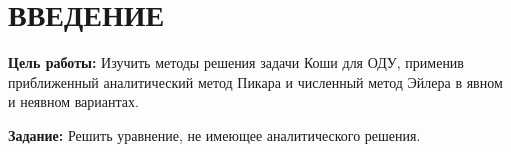 \chapter*{\hfill{}ВВЕДЕНИЕ\hfill}

\textbf{Цель работы:} Изучить методы решения задачи Коши для ОДУ, применив приближенный аналитический метод Пикара и численный метод Эйлера в явном и неявном вариантах.

\textbf{Задание:} Решить уравнение, не имеющее аналитического решения.
